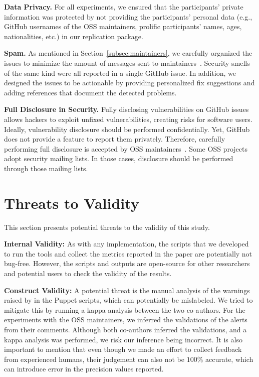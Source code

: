 \textbf{Data Privacy.} For all experiments, we ensured that the 
participants' private information was protected by not providing 
the participants' personal data (e.g., 
GitHub usernames of the OSS maintainers, prolific participants' 
names, ages, nationalities, etc.) in our replication package. 

\textbf{Spam.} As mentioned in Section~\ref{subsec:maintainers}, 
we carefully organized the issues 
to minimize the amount of messages sent to maintainers~\cite{10.1145/2961111.2962628,10.1145/3379597.3387462}. Security smells of the same kind were all reported in 
a single GitHub issue. In addition, we designed the issues to be 
actionable by providing personalized fix suggestions and 
adding references that document the detected problems.

\textbf{Full Disclosure in Security.} Fully disclosing vulnerabilities on GitHub issues 
allows hackers to exploit unfixed vulnerabilities, creating risks for software users. 
Ideally, vulnerability disclosure should be performed confidentially. Yet, GitHub does not 
provide a feature to report them privately. Therefore, carefully performing full disclosure 
is accepted by OSS maintainers~\cite{fulldisc.2005,askanethcode}. Some OSS projects adopt 
security mailing lists. In those cases, disclosure should be performed through those mailing 
lists. 

\section{Threats to Validity}\label{sec:t2v}

This section presents potential threats to the validity of this study.

\textbf{Internal Validity:} As with any implementation, the scripts that we 
developed to run the tools and collect the metrics 
reported in the paper are potentially not bug-free. However, the scripts and 
outputs are open-source for other researchers and
potential users to check the validity of the results. 

\textbf{Construct Validity:} A potential threat is the manual analysis
of the warnings raised by \slic{} in the Puppet scripts, which can potentially be 
mislabeled. We tried to mitigate this by running a kappa analysis between the two co-authors. 
For the experiments with the OSS maintainers, 
we inferred the validations of the alerts from their comments. Although both co-authors inferred the validations, and a kappa analysis was performed, we risk our inference being incorrect. It is also important to mention 
that even though we made an effort to collect feedback from experienced humans,
their judgement can also not be $100\%$ accurate, which can introduce error  
in the precision values reported.

